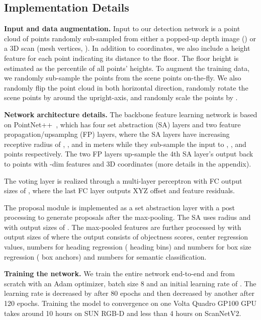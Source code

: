 \documentclass[10pt,twocolumn,letterpaper]{article}
\begin{document}
\subsection{Implementation Details}
\label{sec:votingnet:implmentation}

\smallskip\noindent\textbf{Input and data augmentation.} Input to our detection network is a point cloud of  points randomly sub-sampled from either a popped-up depth image () or a 3D scan (mesh vertices, ).
In addition to  coordinates, we also include a height feature for each point indicating its distance to the floor. The floor height is estimated as the  percentile of all points' heights.
To augment the training data, we randomly sub-sample the points from the scene points on-the-fly. We also randomly flip the point cloud in both horizontal direction, randomly rotate the scene points by  around the upright-axis, and randomly scale the points by .

\smallskip\noindent\textbf{Network architecture details.} The backbone feature learning network is based on PointNet++~\cite{qi2017pointnetplusplus}, which has four set abstraction (SA) layers and two feature propagation/upsamplng (FP) layers, where the SA layers have increasing receptive radius of , ,  and  in meters while they sub-sample the input to , ,  and  points respectively. The two FP layers up-sample the 4th SA layer's output back to  points with -dim features and 3D coordinates (more details in the appendix).








The voting layer is realized through a multi-layer perceptron with FC output sizes of , where the last FC layer outputs XYZ offset and feature residuals.


The proposal module is implemented as a set abstraction layer with a post processing  to generate proposals after the max-pooling. The SA uses radius  and  with output sizes of . The max-pooled features are further processed by  with output sizes of  where the output consists of  objectness scores,  center regression values,  numbers for heading regression ( heading bins) and  numbers for box size regression ( box anchors) and  numbers for semantic classification.

\smallskip\noindent\textbf{Training the network.} We train the entire network end-to-end and from scratch with an Adam optimizer, batch size 8 and an initial learning rate of . The learning rate is decreased by  after 80 epochs and then decreased by another  after 120 epochs. Training the model to convergence on one Volta Quadro GP100 GPU takes around 10 hours on SUN RGB-D and less than 4 hours on ScanNetV2.
\end{document}
